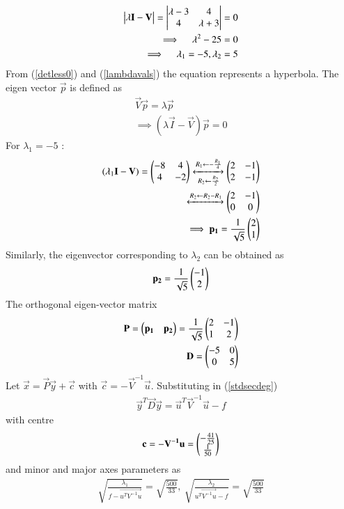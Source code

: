 \documentclass[journal,12pt,twocolumn]{IEEEtran}
\begin{document}
\begin{align}
	\mydet{\lambda\vec{I}-\vec{V}} = \mydet{\lambda-3 & 4 \\ 4 & \lambda + 3} = 0 \\
	\implies \quad \lambda^2-25=0 \\
	\implies \quad \lambda_1=-5,\lambda_2=5   \label{lambdavals}
\end{align}
From (\ref{detless0}) and (\ref{lambdavals}) the equation represents a hyperbola.
The eigen vector $\vec{p}$ is defined as
\begin{align}
	\vec{V}\vec{p}=\lambda\vec{p} \\
	\implies (\lambda\vec{I} - \vec{V})\vec{p}=0
\end{align}
For $\lambda_1 = -5$ :
\begin{align}
	(\lambda_1\mathbf{I}-\mathbf{V})=\begin{pmatrix}-8 & 4 \\ 4 & -2\end{pmatrix} 
	\xleftrightarrow[R_2 \leftarrow \frac{R_2}{2}]{R_1 \leftarrow -\frac{R_1}{4}}
	\begin{pmatrix}2 & -1 \\ 2 & -1\end{pmatrix} \\
	\xleftrightarrow[]{R_2 \leftarrow R_2 - R_1}
	\begin{pmatrix}2 & -1 \\ 0 & 0\end{pmatrix} \\
	\implies \mathbf{p_1}=\frac{1}{\sqrt{5}}\begin{pmatrix}2 \\ 1\end{pmatrix}
\end{align}
Similarly, the eigenvector corresponding to $\lambda_2$ can be obtained as
\begin{align}
	\mathbf{p_2}=\frac{1}{\sqrt{5}}\begin{pmatrix}-1\\2\end{pmatrix}
\end{align}
The orthogonal eigen-vector matrix
\begin{align}
	\mathbf{P}=\begin{pmatrix}\mathbf{p_1} & \mathbf{p_2}\end{pmatrix}
	=\frac{1}{\sqrt{5}}\begin{pmatrix}2 & -1 \\ 1 & 2\end{pmatrix} \\
	\mathbf{D}=\begin{pmatrix}-5 & 0 \\ 0 & 5\end{pmatrix}
\end{align}
Let $\vec{x}=\vec{P}\vec{y} + \vec{c} $ with $\vec{c}=-\vec{V}^{-1}\vec{u}$. Substituting in (\ref{stdsecdeg})
\begin{align}
	\vec{y}^T\vec{D}\vec{y}=\vec{u}^T\vec{V}^{-1}\vec{u}-f 
\end{align}
with centre
\begin{align}
	\mathbf{c}=-\mathbf{V^{-1}u}=\begin{pmatrix}-\frac{41}{25} \\ \frac{1}{50}\end{pmatrix} 
\end{align}
and minor and major axes parameters as
\begin{align}
	\sqrt{\frac{\lambda_1}{f-\vec{u^{T}V^{-1}u}}} = \sqrt{\frac{500}{33}}, \
	\sqrt{\frac{\lambda_2}{\vec{u^{T}V^{-1}u}-f}} = \sqrt{\frac{500}{33}}
\end{align}
\end{document}
